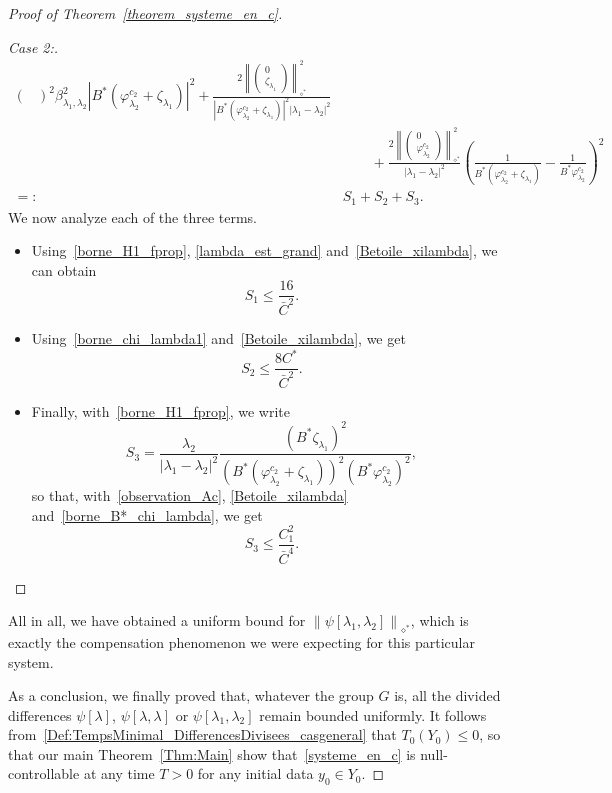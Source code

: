 \documentclass[10pt]{amsart}
\theoremstyle{definition}\newtheorem{defi}[theo]{Definition}\newtheorem{rema}[theo]{Remark}\newtheorem{exam}[theo]{Example}\newtheorem{exem}[theo]{Example}\newtheorem{nota}[theo]{Notation}
\newenvironment{step}[1]{\begin{proof}[#1]}{\let\qed\relax\end{proof}}
\newcommand{\fprop}[2]{\varphi^{#1}_{#2}}
\newcommand{\Fzp}{Y_0}
\newcommand{\normeXalphas}[1]{\left\| #1 \right\|_{\diamond^*}}
\begin{document}
\begin{proof}[Proof of Theorem~\ref{theorem_systeme_en_c}]
\begin{step}{Case 2:}
\begin{align*}
{{\begin{pmatrix}
\end{pmatrix}}^2}{\beta_{\lambda_1,\lambda_2}^2|B^*(\fprop{c_2}{\lambda_2} + \zeta_{\lambda_1})|^2}
+ \frac{2\normeXalphas{
\begin{pmatrix} 0 \\ \zeta_{\lambda_1}
\end{pmatrix}}^2 }{|B^*\left(\fprop{c_2}{\lambda_2} + \zeta_{\lambda_1}\right)|^2 |\lambda_1-\lambda_2|^2}\\
&
\quad\quad + \frac{2\normeXalphas{
\begin{pmatrix} 0 \\ \fprop{c_2}{\lambda_2}
\end{pmatrix}}^2}{|\lambda_1-\lambda_2|^2} \left(\frac{1}{B^*\left(\fprop{c_2}{\lambda_2}+\zeta_{\lambda_1}\right)} - \frac{1}{B^*\fprop{c_2}{\lambda_2}}\right)^2\\
=: & S_1 + S_2 + S_3.
\end{align*}
We now analyze each of the three terms.
\begin{itemize}
\item Using~\eqref{borne_H1_fprop}, \eqref{lambda_est_grand} and~\eqref{Betoile_xilambda}, we can obtain
\[
S_1\leq \frac{16}{\bar{C}^2}.
\]
\item Using~\eqref{borne_chi_lambda1} and~\eqref{Betoile_xilambda}, we get
\[
S_2 \leq \frac{8 C^*}{\bar{C}^2}.
\]
\item Finally, with~\eqref{borne_H1_fprop}, we write
\[
S_3 = \frac{\lambda_2}{|\lambda_1-\lambda_2|^2}\frac{(B^* \zeta_{\lambda_1})^2}{\left(B^*\left(\fprop{c_2}{\lambda_2}+\zeta_{\lambda_1}\right)\right)^2 \left(B^*\fprop{c_2}{\lambda_2}\right)^2},
\]
so that, with~\eqref{observation_Ac}, \eqref{Betoile_xilambda} and~\eqref{borne_B*_chi_lambda}, we get
\[
S_3\leq \frac{C_1^2}{\bar{C}^4}.
\]
\end{itemize}
\end{step}
All in all, we have obtained a uniform bound for $\normeXalphas{\psi[\lambda_1,\lambda_2]}$, which is exactly the compensation phenomenon we were expecting for this particular system.



As a conclusion, we finally proved that, whatever the group $G$ is, all the divided differences $\psi[\lambda]$, $\psi[\lambda,\lambda]$ or $\psi[\lambda_1,\lambda_2]$ remain bounded uniformly. It follows from~\eqref{Def:TempsMinimal_DifferencesDivisees_casgeneral} that $T_0(\Fzp)\leq 0$, so that our main Theorem~\ref{Thm:Main} show that~\eqref{systeme_en_c} is null-controllable at any time $T>0$ for any initial data $y_0\in \Fzp$.
\end{proof}
\end{document}
